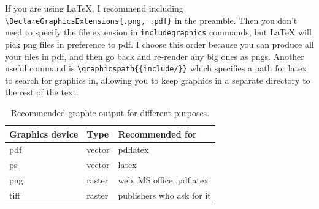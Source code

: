 If you are using \LaTeX, I recommend including \verb|\DeclareGraphicsExtensions{.png, .pdf}| in the preamble.  Then you don't need to specify the file extension in \verb|includegraphics| commands, but \LaTeX{} will pick png files in preference to pdf.  I choose this order because you can produce all your files in pdf, and then go back and re-render any big ones as pngs.  Another useful command is \verb|\graphicspath{{include/}}| which specifies a path for latex to search for graphics in, allowing you to keep graphics in a separate directory to the rest of the text.

\begin{table}
  \begin{center}
  \begin{tabular}{lll}
    \toprule
    Graphics device & Type & Recommended for \\
    \midrule
    pdf   & vector & pdflatex\\
    ps    & vector & latex \\
    png   & raster & web, MS office, pdflatex \\
    tiff  & raster & publishers who ask for it \\
    \bottomrule 
  \end{tabular}
  \end{center}
  \caption{Recommended graphic output for different purposes.}
  \label{tbl:graphic-recommendation}
\end{table}



